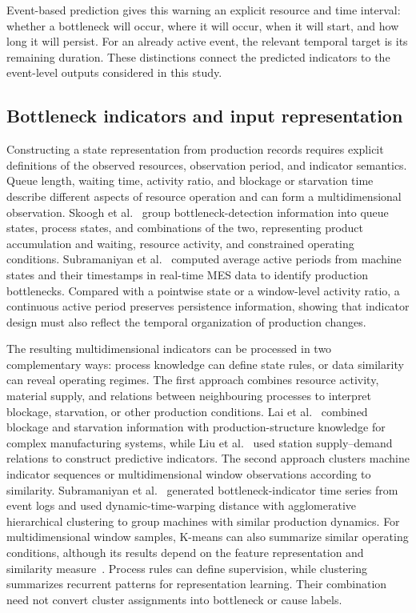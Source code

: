 \documentclass[a4paper,fleqn]{cas-dc}
\begin{document}
Event-based prediction gives this warning an explicit resource and time interval: whether a bottleneck will occur, where it will occur, when it will start, and how long it will persist. For an already active event, the relevant temporal target is its remaining duration. These distinctions connect the predicted indicators to the event-level outputs considered in this study.

\subsection{Bottleneck indicators and input representation}

Constructing a state representation from production records requires explicit definitions of the observed resources, observation period, and indicator semantics. Queue length, waiting time, activity ratio, and blockage or starvation time describe different aspects of resource operation and can form a multidimensional observation. Skoogh et al.~\cite{subramaniyan2023throughput} group bottleneck-detection information into queue states, process states, and combinations of the two, representing product accumulation and waiting, resource activity, and constrained operating conditions. Subramaniyan et al.~\cite{subramaniyan2016realtime} computed average active periods from machine states and their timestamps in real-time MES data to identify production bottlenecks. Compared with a pointwise state or a window-level activity ratio, a continuous active period preserves persistence information, showing that indicator design must also reflect the temporal organization of production changes.

The resulting multidimensional indicators can be processed in two complementary ways: process knowledge can define state rules, or data similarity can reveal operating regimes. The first approach combines resource activity, material supply, and relations between neighbouring processes to interpret blockage, starvation, or other production conditions. Lai et al.~\cite{lai2021data} combined blockage and starvation information with production-structure knowledge for complex manufacturing systems, while Liu et al.~\cite{liu2023lstmdam} used station supply--demand relations to construct predictive indicators. The second approach clusters machine indicator sequences or multidimensional window observations according to similarity. Subramaniyan et al.~\cite{subramaniyan2020clustering} generated bottleneck-indicator time series from event logs and used dynamic-time-warping distance with agglomerative hierarchical clustering to group machines with similar production dynamics. For multidimensional window samples, K-means can also summarize similar operating conditions, although its results depend on the feature representation and similarity measure~\cite{jain2010clustering}. Process rules can define supervision, while clustering summarizes recurrent patterns for representation learning. Their combination need not convert cluster assignments into bottleneck or cause labels.
\end{document}
